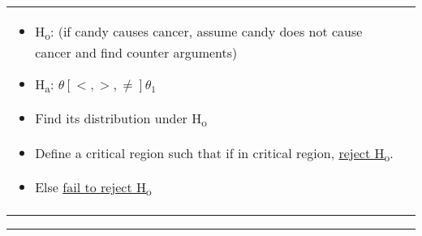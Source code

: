\documentclass[6pt]{article}
\newcommand{\HL}{\par\noindent\rule{\textwidth}{0.4pt}}
\begin{document}
\begin{footnotesize}
\begin{tabular}{l | l}
{\begin{flushright}
\begin{itemize}
\item H\textsubscript{o}: (if candy causes cancer, assume candy does not cause cancer and find counter arguments)
\item H\textsubscript{a}: $\theta [<,>,\ne] \theta_{1}$
\item Find its distribution under H\textsubscript{o}
\item Define a critical region such that if in critical region, \underline{reject H\textsubscript{o}}.
\item Else \underline{fail to reject H\textsubscript{o}}
\end{itemize}
\end{flushright}
}

\end{tabular}
\HL


\end{footnotesize}
\end{document}
